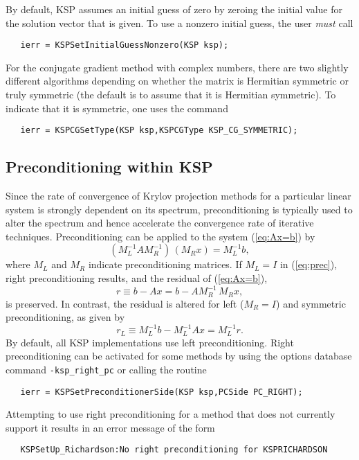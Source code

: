 By default, KSP assumes an initial guess of zero by zeroing the initial 
value for the solution vector that is given. To use a nonzero 
initial guess, the user {\em must} call 
\begin{verbatim}
   ierr = KSPSetInitialGuessNonzero(KSP ksp);
\end{verbatim}

For the conjugate gradient method with complex numbers, there are two
slightly different algorithms depending on whether the matrix is 
Hermitian symmetric or truly symmetric (the default is to assume that
it is Hermitian symmetric). To indicate that it is symmetric, one uses the command
  
\begin{verbatim}
   ierr = KSPCGSetType(KSP ksp,KSPCGType KSP_CG_SYMMETRIC);
\end{verbatim}

\subsection{Preconditioning within KSP} 
\label{sec:ksppc}

Since the rate of convergence of Krylov projection methods for a
particular linear system is strongly dependent on its spectrum,
preconditioning is typically used to alter the spectrum and hence
accelerate the convergence rate of iterative techniques.
Preconditioning can be applied to the system (\ref{eq:Ax=b}) by
\begin{equation}
   (M_L^{-1} A M_R^{-1}) \, (M_R x) = M_L^{-1} b,
\label{eq:prec}
\end{equation}
where $M_L$ and $M_R$ indicate preconditioning matrices.  If $M_L = I$
in (\ref{eq:prec}), right preconditioning results, and the
residual of (\ref{eq:Ax=b}),
  \[ r \equiv b - Ax = b - A M_R^{-1} \, M_R x, \]
is preserved.  In contrast, the residual is altered for left 
($M_R = I$) and symmetric preconditioning, as given by
  \[ r_L \equiv M_L^{-1} b - M_L^{-1} A x = M_L^{-1} r. \]
By default, all KSP implementations use left preconditioning.  
Right preconditioning can be activated for some methods by
using the options database command {\tt -ksp\_right\_pc} or
calling the routine  
\begin{verbatim}
   ierr = KSPSetPreconditionerSide(KSP ksp,PCSide PC_RIGHT);
\end{verbatim}
Attempting to use right preconditioning for a method that
does not currently support it results in an error message of the form
\begin{verbatim}
   KSPSetUp_Richardson:No right preconditioning for KSPRICHARDSON
\end{verbatim}

